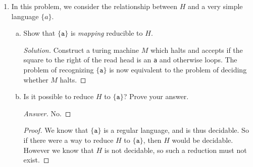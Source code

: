 \documentclass[10pt]{article}
\begin{document}
\begin{enumerate}[1)]
\begin{enumerate}[a)]
\item
Use the graph algorithm we describe to find a coloring of $G$.
\begin{proof}[Solution]
Start with $B$ and color each edge alternately.
\begin{align*}
Red &= \{(B, 1), (B, 4)\}\\
Blue &= \{(B, 3)\}
\end{align*}
Now do vertex $3$:
\begin{align*}
Red &= \{(B, 1), (B, 4), (A, 3)\}\\
Blue &= \{(B, 3)\}
\end{align*}
Now vertex $A$:
\begin{align*}
Red &= \{(B, 1), (B, 4), (A, 3)\}\\
Blue &= \{(B, 3), (A, 4)\}
\end{align*}
Now vertex $4$: (it has one of each already, so pick arbitrarily.)
\begin{align*}
Red &= \{(B, 1), (B, 4), (A, 3)\}\\
Blue &= \{(B, 3), (A, 4), (C, 4)\}
\end{align*}
And now the last edge:
\begin{align*}
Red &= \{(B, 1), (B, 4), (A, 3), (D, 2)\}\\
Blue &= \{(B, 3), (A, 4), (C, 4)\}
\end{align*}
\end{proof}
\end{enumerate}



\item
In this problem, we consider the relationship between $H$ and a very simple language $\{a\}$.
\begin{enumerate}[a)]

\item
Show that $\{\texttt{a}\}$ is \emph{mapping} reducible to $H$.  
\begin{proof}[Solution]
Construct a turing machine $M$ which halts and accepts if the square to the right of the read head is an \texttt{a} and otherwise loops.  The problem of recognizing $\{\texttt{a}\}$ is now equivalent to the problem of deciding whether $M$ halts.
\end{proof}

\item
Is it possible to reduce $H$ to $\{\texttt{a}\}$?  Prove your answer.
\begin{proof}[Answer]
No.
\end{proof}
\begin{proof}[Proof]
We know that $\{\texttt{a}\}$ is a regular language, and is thus decidable.  So if there were a way to reduce $H$ to $\{\texttt{a}\}$, then $H$ would be decidable.  However we know that $H$ is not decidable, so such a reduction must not exist.
\end{proof}
\end{enumerate}


\end{enumerate}
\end{document}

